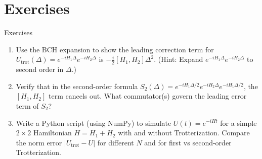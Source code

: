 \documentclass{beamer}
\begin{document}
%
\section{Exercises}

\begin{frame}{Exercises}
\begin{enumerate}
\item Use the BCH expansion to show the leading correction term for $U_{\text{trot}}(\Delta) = e^{-iH_1\Delta}e^{-iH_2\Delta}$ is $-\tfrac{i}{2}[H_1,H_2]\Delta^2$.  (Hint: Expand $e^{-iH_1\Delta}e^{-iH_2\Delta}$ to second order in $\Delta$.)
\item Verify that in the second-order formula $S_2(\Delta)=e^{-iH_1\Delta/2}e^{-iH_2\Delta}e^{-iH_1\Delta/2}$, the $[H_1,H_2]$ term cancels out. What commutator(s) govern the leading error term of $S_2$?
\item Write a Python script (using NumPy) to simulate $U(t)=e^{-iHt}$ for a simple $2\times2$ Hamiltonian $H=H_1+H_2$ with and without Trotterization. Compare the norm error $|U_{\text{trot}} - U|$ for different $N$ and for first vs second-order Trotterization.
\end{enumerate}
\end{frame}
\end{document}
